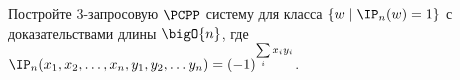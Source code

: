 Постройте $3$-запросовую $\PCPP$ систему для класса $\{w \mid \IP_n(w) = 1\}$ с доказательствами длины
$\bigO{n}$, где $\IP_n(x_1, x_2, \dots, x_n, y_1, y_2, \dots y_n) = (-1)^{\sum\limits_i x_i y_i}$.